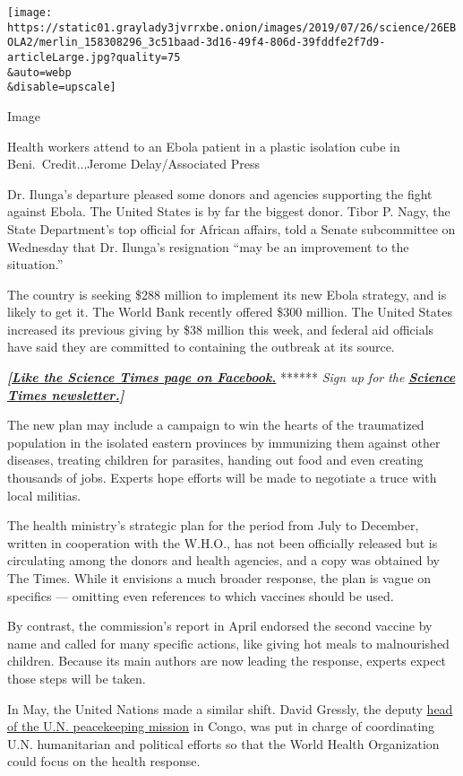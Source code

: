 \texttt{[image: https://static01.graylady3jvrrxbe.onion/images/2019/07/26/science/26EBOLA2/merlin\_158308296\_3c51baad-3d16-49f4-806d-39fddfe2f7d9-articleLarge.jpg?quality=75\\\&auto=webp\\\&disable=upscale]}

Image

Health workers attend to an Ebola patient in a plastic isolation cube in
Beni.~Credit...Jerome Delay/Associated Press

Dr. Ilunga's departure pleased some donors and agencies supporting the
fight against Ebola. The United States is by far the biggest donor.
Tibor P. Nagy, the State Department's top official for African affairs,
told a Senate subcommittee on Wednesday that Dr. Ilunga's resignation
``may be an improvement to the situation.''

The country is seeking \$288 million to implement its new Ebola
strategy, and is likely to get it. The World Bank recently offered \$300
million. The United States increased its previous giving by \$38 million
this week, and federal aid officials have said they are committed to
containing the outbreak at its source.

\textbf{\emph{{[}}\href{http://on.fb.me/1paTQ1h}{\emph{Like the Science
Times page on Facebook.}}} ****** \emph{\textbar{} Sign up for the}
\textbf{\href{http://nyti.ms/1MbHaRU}{\emph{Science Times
newsletter.}}\emph{{]}}}

The new plan may include a campaign to win the hearts of the traumatized
population in the isolated eastern provinces by immunizing them against
other diseases, treating children for parasites, handing out food and
even creating thousands of jobs. Experts hope efforts will be made to
negotiate a truce with local militias.

The health ministry's strategic plan for the period from July to
December, written in cooperation with the W.H.O., has not been
officially released but is circulating among the donors and health
agencies, and a copy was obtained by The Times. While it envisions a
much broader response, the plan is vague on specifics --- omitting even
references to which vaccines should be used.

By contrast, the commission's report in April endorsed the second
vaccine by name and called for many specific actions, like giving hot
meals to malnourished children. Because its main authors are now leading
the response, experts expect those steps will be taken.

In May, the United Nations made a similar shift. David Gressly, the
deputy
\href{https://www.who.int/news-room/detail/23-05-2019-united-nations-strengthens-ebola-response-in-democratic-republic-of-the-congo}{head
of the U.N. peacekeeping mission} in Congo, was put in charge of
coordinating U.N. humanitarian and political efforts so that the World
Health Organization could focus on the health response.

